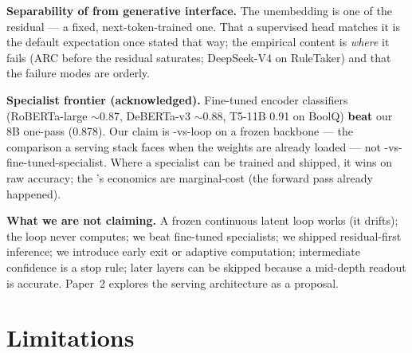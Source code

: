 \textbf{Separability of \head{} from generative interface.} The unembedding is
one \head{} of the residual --- a fixed, next-token-trained one. That a
supervised head matches it is the default expectation once stated that way;
the empirical content is \emph{where} it fails (ARC before the residual
saturates; DeepSeek-V4 on RuleTaker)
and that the failure modes are orderly.

\textbf{Specialist frontier (acknowledged).} Fine-tuned encoder classifiers
(RoBERTa-large $\sim$0.87, DeBERTa-v3 $\sim$0.88, T5-11B 0.91 on BoolQ)
\textbf{beat} our 8B one-pass \head{} (0.878). Our claim is \head{}-vs-loop on
a frozen backbone --- the comparison a serving stack faces when the weights
are already loaded --- not \head{}-vs-fine-tuned-specialist. Where a
specialist can be trained and shipped, it wins on raw accuracy; the \head{}'s
economics are marginal-cost (the forward pass already happened).

\textbf{What we are not claiming.} A frozen continuous latent loop works (it
drifts); the loop never computes; we beat fine-tuned specialists; we
shipped residual-first inference; we introduce early exit or adaptive
computation; intermediate confidence is a stop rule; later layers can be
skipped because a mid-depth readout is accurate. Paper~2 explores the serving
architecture as a proposal.

\section{Limitations}
\label{sec:limits}

